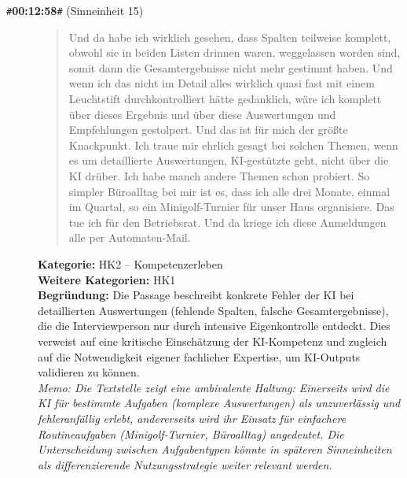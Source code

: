\begin{description}
  \item[\texttt{\#}\textbf{00:12:58}\texttt{\#} (Sinneinheit 15)]
  \begin{quote}
  Und da habe ich wirklich gesehen, dass Spalten teilweise komplett, obwohl sie in beiden Listen drinnen waren, weggelassen worden sind, somit dann die Gesamtergebnisse nicht mehr gestimmt haben. Und wenn ich das nicht im Detail alles wirklich quasi fast mit einem Leuchtstift durchkontrolliert hätte gedanklich, wäre ich komplett über dieses Ergebnis und über diese Auswertungen und Empfehlungen gestolpert. Und das ist für mich der größte Knackpunkt. Ich traue mir ehrlich gesagt bei solchen Themen, wenn es um detaillierte Auswertungen, KI-gestützte geht, nicht über die KI drüber. Ich habe manch andere Themen schon probiert. So simpler Büroalltag bei mir ist es, dass ich alle drei Monate, einmal im Quartal, so ein Minigolf-Turnier für unser Haus organisiere. Das tue ich für den Betriebsrat. Und da kriege ich diese Anmeldungen alle per Automaten-Mail.
  \end{quote}
  \textbf{Kategorie:} HK2 -- Kompetenzerleben\\
  \textbf{Weitere Kategorien:} HK1\\
  \textbf{Begr\"undung:} Die Passage beschreibt konkrete Fehler der KI bei detaillierten Auswertungen (fehlende Spalten, falsche Gesamtergebnisse), die die Interviewperson nur durch intensive Eigenkontrolle entdeckt. Dies verweist auf eine kritische Einschätzung der KI-Kompetenz und zugleich auf die Notwendigkeit eigener fachlicher Expertise, um KI-Outputs validieren zu können.
  \\\textit{Memo: Die Textstelle zeigt eine ambivalente Haltung: Einerseits wird die KI für bestimmte Aufgaben (komplexe Auswertungen) als unzuverlässig und fehleranfällig erlebt, andererseits wird ihr Einsatz für einfachere Routineaufgaben (Minigolf-Turnier, Büroalltag) angedeutet. Die Unterscheidung zwischen Aufgabentypen könnte in späteren Sinneinheiten als differenzierende Nutzungsstrategie weiter relevant werden.}
\end{description}
\medskip

